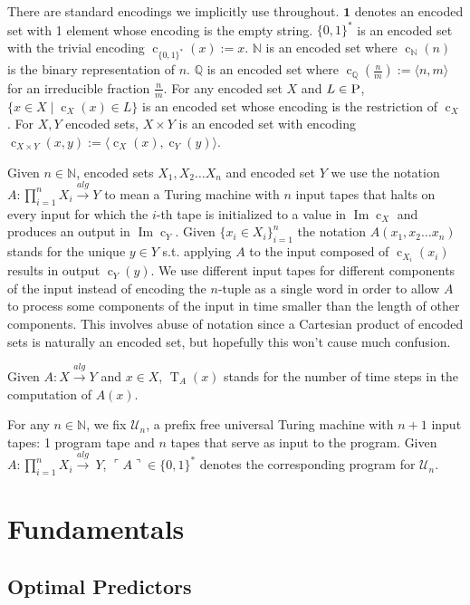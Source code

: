 \documentclass{article}
\theoremstyle{definition}
\theoremstyle{plain}
\newcommand{\Words}{{\{ 0, 1 \}^*}}
\DeclareMathOperator{\Img}{Im}
\DeclareMathOperator{\T}{T}
\DeclareMathOperator{\En}{c}
\newcommand{\Nats}{\mathbb{N}}
\newcommand{\Rats}{\mathbb{Q}}
\newcommand{\Chev}[1]{\langle #1 \rangle}
\newcommand{\Quote}[1]{\ulcorner #1 \urcorner}
\begin{document}
There are standard encodings we implicitly use throughout. $\bm{1}$ denotes an encoded set with 1 element whose encoding is the empty string. $\Words$ is an encoded set with the trivial encoding ${\En_\Words(x):=x}$. $\Nats$ is an encoded set where $\En_\Nats(n)$ is the binary representation of $n$. $\Rats$ is an encoded set where ${\En_\Rats(\frac{n}{m}):=\Chev{n,m}}$ for an irreducible fraction $\frac{n}{m}$. For any encoded set $X$ and $L \in \textsc{P}$, $\{x \in X \mid \En_X(x) \in L\}$ is an encoded set whose encoding is the restriction of $\En_X$. For $X,Y$ encoded sets, $X \times Y$ is an encoded set with encoding $\En_{X \times Y}(x,y):=\Chev{\En_X(x),\En_Y(y)}$.

Given $n \in \Nats$, encoded sets $X_1, X_2 \ldots X_n$ and encoded set $Y$ we use the notation $A: \prod_{i=1}^n X_i \xrightarrow{alg} Y$ to mean a Turing machine with $n$ input tapes that halts on every input for which the $i$-th tape is initialized to a value in $\Img \En_X$ and produces an output in $\Img \En_Y$. Given $\{x_i \in X_i\}_{i=1}^n$ the notation $A(x_1, x_2 \ldots x_n)$ stands for the unique $y \in Y$ s.t. applying $A$ to the input composed of $\En_{X_i}(x_i)$ results in output $\En_Y(y)$. We use different input tapes for different components of the input instead of encoding the $n$-tuple as a single word in order to allow $A$ to process some components of the input in time smaller than the length of other components. This involves abuse of notation since a Cartesian product of encoded sets is naturally an encoded set, but hopefully this won't cause much confusion.

Given $A: X \xrightarrow{alg} Y$ and $x \in X$, $\T_A(x)$ stands for the number of time steps in the computation of $A(x)$.

For any $n \in \Nats$, we fix $\mathcal{U}_n$, a prefix free universal Turing machine with $n+1$ input tapes: 1 program tape and $n$ tapes that serve as input to the program. Given $A: \prod_{i=1}^n X_i \xrightarrow{alg}\ Y$, $\Quote{A} \in \Words$ denotes the corresponding program for $\mathcal{U}_n$.

\section{Fundamentals}
\label{sec:fundamentals}

\subsection{Optimal Predictors}
\end{document}
